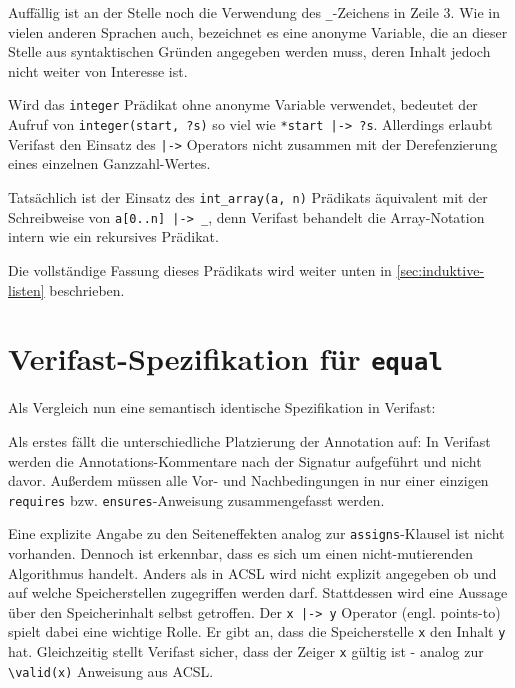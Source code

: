 Auffällig ist an der Stelle noch die Verwendung des \lstinline{_}-Zeichens in Zeile 3. Wie in vielen anderen 
Sprachen auch, bezeichnet es eine anonyme Variable, die an dieser Stelle aus syntaktischen Gründen angegeben werden
muss, deren Inhalt jedoch nicht weiter von Interesse ist. 

Wird das \lstinline{integer} Prädikat ohne anonyme Variable verwendet, bedeutet der Aufruf von 
\lstinline{integer(start, ?s)} so viel wie \lstinline{*start |-> ?s}. Allerdings erlaubt Verifast
den Einsatz des \lstinline{|->} Operators nicht zusammen mit der Derefenzierung eines einzelnen
Ganzzahl-Wertes.

Tatsächlich ist der Einsatz des \lstinline{int_array(a, n)} Prädikats äquivalent mit der Schreibweise 
von \lstinline{a[0..n] |-> _}, denn Verifast behandelt die Array-Notation intern wie ein rekursives
Prädikat.

Die vollständige Fassung dieses Prädikats wird weiter unten in \ref{sec:induktive-listen} beschrieben.


\section{Verifast-Spezifikation für \texttt{equal}}
\label{sec:design-by-contract:verifast-variante}

Als Vergleich nun eine semantisch identische Spezifikation in Verifast:



Als erstes fällt die unterschiedliche Platzierung der Annotation auf: In Verifast werden die 
Annotations-Kommentare nach der Signatur aufgeführt und nicht davor. Außerdem müssen alle Vor- und 
Nachbedingungen in nur einer einzigen \lstinline{requires} bzw. \lstinline{ensures}-Anweisung 
zusammengefasst werden.

Eine explizite Angabe zu den Seiteneffekten analog zur \lstinline{assigns}-Klausel ist nicht vorhanden. 
Dennoch ist erkennbar, dass es sich um einen nicht-mutierenden Algorithmus handelt. Anders als in ACSL wird 
nicht explizit angegeben ob und auf welche Speicherstellen zugegriffen werden darf. Stattdessen wird eine 
Aussage über den Speicherinhalt selbst getroffen. Der \lstinline{x |-> y} Operator (engl. points-to) spielt dabei eine wichtige Rolle. Er gibt an, 
dass die Speicherstelle \lstinline{x} den Inhalt \lstinline{y} hat. Gleichzeitig stellt Verifast sicher, 
dass der Zeiger \lstinline{x} gültig ist - analog zur \lstinline{\valid(x)} Anweisung aus ACSL.

